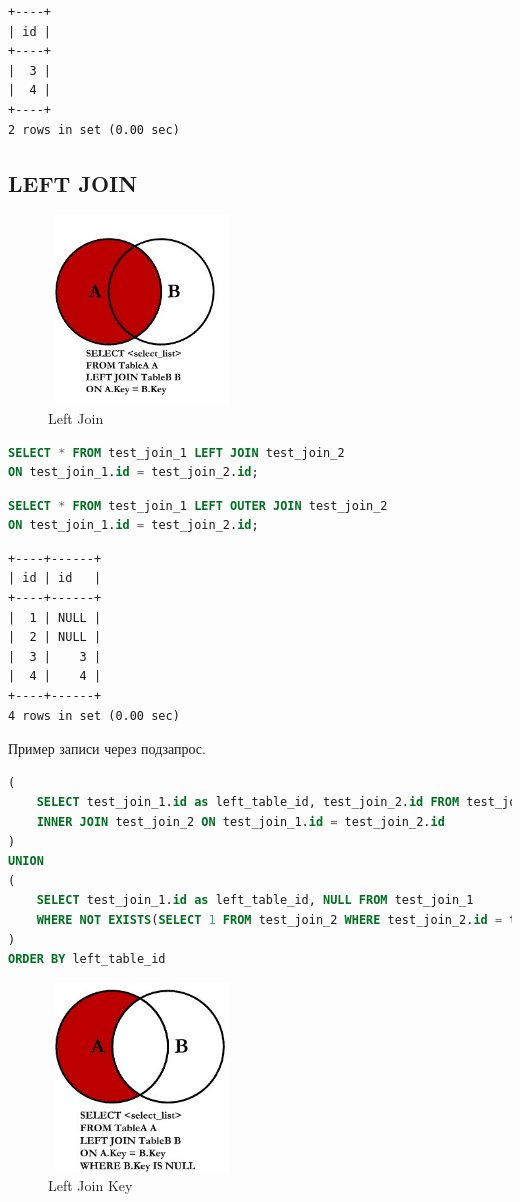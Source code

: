 \documentclass[12pt,a4paper]{article}
\begin{document}
\begin{lstlisting}[basicstyle = \tiny\ttfamily, columns = fixed]
+----+
| id |
+----+
|  3 |
|  4 |
+----+
2 rows in set (0.00 sec)
\end{lstlisting}

\subsection{LEFT JOIN}
\begin{figure}[!ht]
    \includegraphics[width=5cm,height=5cm]{images/Lab5/left_join.jpg}
    \caption{Left Join}
    \label{fig:LeftJoin}
\end{figure}
\begin{lstlisting}[language=SQL]
SELECT * FROM test_join_1 LEFT JOIN test_join_2 
ON test_join_1.id = test_join_2.id;
\end{lstlisting}

\begin{lstlisting}[language=SQL]
SELECT * FROM test_join_1 LEFT OUTER JOIN test_join_2 
ON test_join_1.id = test_join_2.id;
\end{lstlisting}

\begin{lstlisting}[basicstyle = \tiny\ttfamily, columns = fixed]
+----+------+
| id | id   |
+----+------+
|  1 | NULL |
|  2 | NULL |
|  3 |    3 |
|  4 |    4 |
+----+------+
4 rows in set (0.00 sec)
\end{lstlisting}

Пример записи через подзапрос.
\begin{lstlisting}[language=SQL]
(
    SELECT test_join_1.id as left_table_id, test_join_2.id FROM test_join_1
	INNER JOIN test_join_2 ON test_join_1.id = test_join_2.id
)
UNION
(
	SELECT test_join_1.id as left_table_id, NULL FROM test_join_1
    WHERE NOT EXISTS(SELECT 1 FROM test_join_2 WHERE test_join_2.id = test_join_1.id)
)
ORDER BY left_table_id
\end{lstlisting}

\begin{figure}[!ht]
    \includegraphics[width=5cm,height=5cm]{images/Lab5/left_join_key.jpg}
    \caption{Left Join Key}
    \label{fig:LeftJoinKey}
\end{figure}
\end{document}
